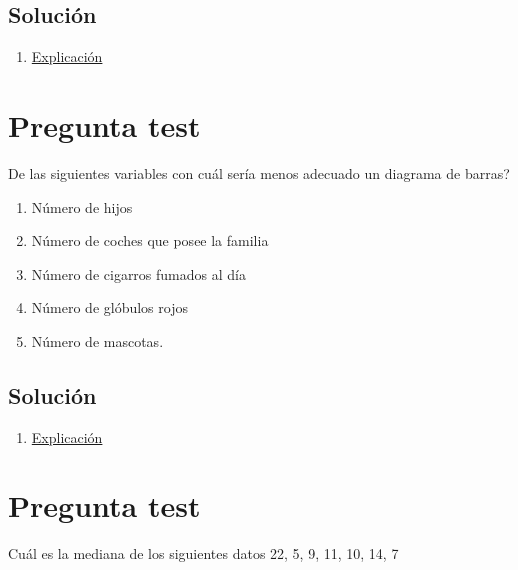\documentclass[
]{book}
\providecommand{\tightlist}{%
  \setlength{\itemsep}{0pt}\setlength{\parskip}{0pt}}
\begin{document}
\hypertarget{soluciuxf3n-54}{%
\subsection{Solución}\label{soluciuxf3n-54}}

\begin{enumerate}
\def\labelenumi{\alph{enumi})}
\setcounter{enumi}{2}
\tightlist
\item
  \href{https://1fjmanzano.github.io/bioestadistica/tipos-de-variables.html}{Explicación}
\end{enumerate}

\hypertarget{pregunta-test-53}{%
\section{Pregunta test}\label{pregunta-test-53}}

De las siguientes variables con cuál sería menos adecuado un diagrama de barras?

\begin{enumerate}
\def\labelenumi{\alph{enumi})}
\tightlist
\item
  Número de hijos
\item
  Número de coches que posee la familia
\item
  Número de cigarros fumados al día
\item
  Número de glóbulos rojos
\item
  Número de mascotas.
\end{enumerate}

\hypertarget{soluciuxf3n-55}{%
\subsection{Solución}\label{soluciuxf3n-55}}

\begin{enumerate}
\def\labelenumi{\alph{enumi})}
\setcounter{enumi}{3}
\tightlist
\item
  \href{https://1fjmanzano.github.io/bioestadistica/representaciones-gra\%CC\%81ficas.html}{Explicación}
\end{enumerate}

\hypertarget{pregunta-test-54}{%
\section{Pregunta test}\label{pregunta-test-54}}

Cuál es la mediana de los siguientes datos 22, 5, 9, 11, 10, 14, 7
\end{document}
